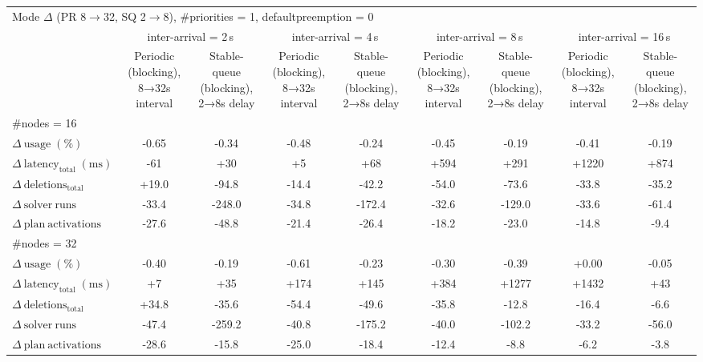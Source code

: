 
\begin{tabular}{l c c c c c c c c}
\toprule
\multicolumn{9}{l}{Mode $\Delta$ (PR 8$\rightarrow$32, SQ 2$\rightarrow$8), \#priorities = 1, defaultpreemption = 0} \\
\addlinespace[0.2em]
 & \multicolumn{2}{c}{inter-arrival = 2\,s} & \multicolumn{2}{c}{inter-arrival = 4\,s} & \multicolumn{2}{c}{inter-arrival = 8\,s} & \multicolumn{2}{c}{inter-arrival = 16\,s} \\
\cmidrule(lr){2-3}\cmidrule(lr){4-5}\cmidrule(lr){6-7}\cmidrule(lr){8-9}
 & Periodic (blocking), 8→32s interval & Stable-queue (blocking), 2→8s delay & Periodic (blocking), 8→32s interval & Stable-queue (blocking), 2→8s delay & Periodic (blocking), 8→32s interval & Stable-queue (blocking), 2→8s delay & Periodic (blocking), 8→32s interval & Stable-queue (blocking), 2→8s delay \\
\midrule
\multicolumn{9}{l}{\#nodes = 16} \\
\midrule
$\Delta\ \mathrm{usage}\;(\%)$ & -0.65 & -0.34 & -0.48 & -0.24 & -0.45 & -0.19 & -0.41 & -0.19 \\
$\Delta\ \mathrm{latency}_{\mathrm{total}}\;(\mathrm{ms})$ & -61 & +30 & +5 & +68 & +594 & +291 & +1220 & +874 \\
$\Delta\ \mathrm{deletions}_{\mathrm{total}}$ & +19.0 & -94.8 & -14.4 & -42.2 & -54.0 & -73.6 & -33.8 & -35.2 \\
$\Delta\ \mathrm{solver\ runs}$ & -33.4 & -248.0 & -34.8 & -172.4 & -32.6 & -129.0 & -33.6 & -61.4 \\
$\Delta\ \mathrm{plan\ activations}$ & -27.6 & -48.8 & -21.4 & -26.4 & -18.2 & -23.0 & -14.8 & -9.4 \\
\midrule
\multicolumn{9}{l}{\#nodes = 32} \\
\midrule
$\Delta\ \mathrm{usage}\;(\%)$ & -0.40 & -0.19 & -0.61 & -0.23 & -0.30 & -0.39 & +0.00 & -0.05 \\
$\Delta\ \mathrm{latency}_{\mathrm{total}}\;(\mathrm{ms})$ & +7 & +35 & +174 & +145 & +384 & +1277 & +1432 & +43 \\
$\Delta\ \mathrm{deletions}_{\mathrm{total}}$ & +34.8 & -35.6 & -54.4 & -49.6 & -35.8 & -12.8 & -16.4 & -6.6 \\
$\Delta\ \mathrm{solver\ runs}$ & -47.4 & -259.2 & -40.8 & -175.2 & -40.0 & -102.2 & -33.2 & -56.0 \\
$\Delta\ \mathrm{plan\ activations}$ & -28.6 & -15.8 & -25.0 & -18.4 & -12.4 & -8.8 & -6.2 & -3.8 \\
\bottomrule
\end{tabular}

